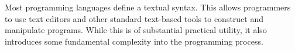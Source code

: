 






Most programming languages define a textual syntax. This allows programmers to use text editors and other standard text-based tools to construct and manipulate programs. While this is of substantial practical utility, it also introduces some fundamental complexity into the programming process. 

